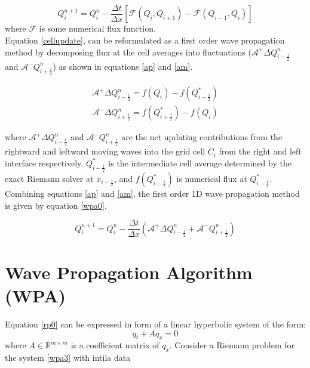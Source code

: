 \documentclass[12pt,a4paper]{article}
\begin{document}
      \begin{equation}
      	Q_{i}^{n+1} = Q_{i}^{n} - \frac{\Delta t}{\Delta x} \left[ \mathcal{F}(Q_{i} , Q_{i+1} ) - \mathcal{F}(Q_{i-1} , Q_{i} ) \right]
      	\label{cellupdate}
      \end{equation}
      where $\mathcal{F}$ is some numerical flux function.\\
     
	\noindent Equation \eqref{cellupdate}, can be reformulated as a first order wave propagation method by decomposing flux at the cell averages into fluctuations ($\mathcal{A^{+}}\Delta 	Q_{i-\frac{1}{2}}^{n}$ and  $\mathcal{A^{-}}Q_{i+\frac{1}{2}}^{n}$) as shown in equations \eqref{ap} and \eqref{am}. 
	
	\begin{eqnarray}
		\mathcal{A^{+}}\Delta Q_{i-\frac{1}{2}}^{n} = f(Q_{i}) - f(Q_{i-\frac{1}{2}}^{*})
		\label{ap}\\
		\mathcal{A^{-}}\Delta Q_{i+\frac{1}{2}}^{n} = f(Q_{i+\frac{1}{2}}^{*}) - f(Q_{i}) 
		\label{am}
	\end{eqnarray}

	\noindent where  $\mathcal{A^{+}}\Delta 	Q_{i-\frac{1}{2}}^{n}$ and  $\mathcal{A^{-}}Q_{i+\frac{1}{2}}^{n}$ are the net updating contributions from the rightward and leftward moving waves into the grid cell $C_{i}$  from the right and left interface respectively,  $Q_{i-\frac{1}{2}}^{*}$ is the intermediate cell average determined by the exact Riemann solver at $x_{i-\frac{1}{2}}$, and $ f(Q_{i-\frac{1}{2}}^{*})$ is numerical flux at $Q_{i-\frac{1}{2}}^{*}$. Combining equations \eqref{ap} and \eqref{am}, the  first order 1D  wave propagation method is given by equation \eqref{wpa0}.
	
	\begin{equation}
		Q_{i}^{n+1} =  Q_{i}^{n} - \frac{\Delta t}{\Delta x}(\mathcal{A^{+}}\Delta 	Q_{i-\frac{1}{2}}^{n} + \mathcal{A^{-}}Q_{i+\frac{1}{2}}^{n})
		\label{wpa0}
	\end{equation}


	\section{Wave Propagation Algorithm (WPA)}
	\label{section:my}
	 \noindent Equation \eqref{rp0} can be expressed in form of a linear hyperbolic system of the form:
	\begin{equation}
		q_{t} + Aq_{x} = 0
		\label{wpa3}
	\end{equation}
	where  $A \in \mathbb{R}^{m\times m}$  is a coefficient matrix of $q_{x}$.  Consider a Riemann problem for the system  \eqref{wpa3} with intila data 
	
\end{document}
